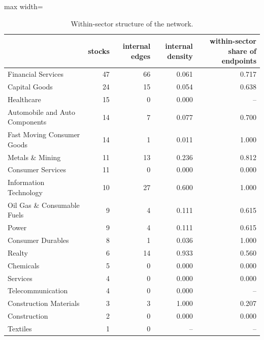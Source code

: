 \begin{table}
\centering
\caption{Within-sector structure of the network.}
\label{tab:sector_homophily}
\begin{adjustbox}{max width=\textwidth}
\begin{tabular}{lrrrr}
\toprule
 & stocks & internal edges & internal density & within-sector share of endpoints \\
\midrule
Financial Services & 47 & 66 & 0.061 & 0.717 \\
Capital Goods & 24 & 15 & 0.054 & 0.638 \\
Healthcare & 15 & 0 & 0.000 & -- \\
Automobile and Auto Components & 14 & 7 & 0.077 & 0.700 \\
Fast Moving Consumer Goods & 14 & 1 & 0.011 & 1.000 \\
Metals \& Mining & 11 & 13 & 0.236 & 0.812 \\
Consumer Services & 11 & 0 & 0.000 & 0.000 \\
Information Technology & 10 & 27 & 0.600 & 1.000 \\
Oil Gas \& Consumable Fuels & 9 & 4 & 0.111 & 0.615 \\
Power & 9 & 4 & 0.111 & 0.615 \\
Consumer Durables & 8 & 1 & 0.036 & 1.000 \\
Realty & 6 & 14 & 0.933 & 0.560 \\
Chemicals & 5 & 0 & 0.000 & 0.000 \\
Services & 4 & 0 & 0.000 & 0.000 \\
Telecommunication & 4 & 0 & 0.000 & -- \\
Construction Materials & 3 & 3 & 1.000 & 0.207 \\
Construction & 2 & 0 & 0.000 & 0.000 \\
Textiles & 1 & 0 & -- & -- \\
\bottomrule
\end{tabular}
\end{adjustbox}
\end{table}
